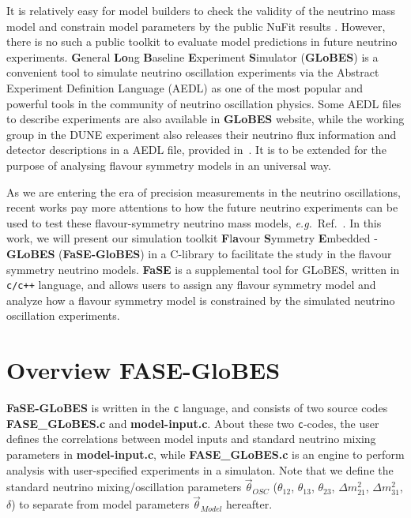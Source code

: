 \documentclass[aps,prd,nofootinbib,preprint]{revtex4}
\begin{document}
It is relatively easy for model builders to check the validity of the neutrino mass model and constrain model parameters by the public NuFit results \cite{Esteban:2018azc}. However, there is no such a public toolkit to evaluate model predictions in future neutrino experiments. \textbf{G}eneral \textbf{Lo}ng \textbf{B}aseline \textbf{E}xperiment \textbf{S}imulator (\textbf{GLoBES}) \cite{Huber:2004ka,Huber:2007ji} is a convenient tool to simulate neutrino oscillation experiments via the Abstract Experiment Definition Language (AEDL) as one of the most popular and powerful tools in the community of neutrino oscillation physics. Some AEDL files to describe experiments are also available in \textbf{GLoBES} website, while the working group in the DUNE experiment also releases their neutrino flux information and detector descriptions in a AEDL file, provided in~\cite{Alion:2016uaj}. It is to be extended for the purpose of analysing flavour symmetry models in an universal way. 

As we are entering the era of precision measurements in the neutrino oscillations, recent works pay more attentions to how the future neutrino experiments can be used to test these flavour-symmetry neutrino mass models, \textit{e.g.}~Ref.~\cite{Ballett:2016yod,Chatterjee:2017xkb, Ding:2019zhn, Tang:2019edw, Blennow:2020snb}. In this work, we will present our simulation toolkit \textbf{F}l\textbf{a}vour \textbf{S}ymmetry \textbf{E}mbedded - \textbf{GLoBES} (\textbf{FaSE-GloBES}) in a C-library to facilitate the study in the flavour symmetry neutrino models. \textbf{FaSE} is a supplemental tool for GLoBES, written in \texttt{c/c++} language, and allows users to assign any flavour symmetry model and analyze how a flavour symmetry model is constrained by the simulated neutrino oscillation experiments.

\section{Overview FASE-GloBES}\label{sec:overview}

\textbf{FaSE-GLoBES} is written in the \texttt{c} language, and consists of two source codes \textbf{FASE\_GLoBES.c} and \textbf{model-input.c}. About these two \texttt{c}-codes, the user defines the correlations between model inputs and standard neutrino mixing parameters in \textbf{model-input.c}, while \textbf{FASE\_GLoBES.c} is an engine to perform analysis with user-specified experiments in a simulaton. Note that we define the standard neutrino mixing/oscillation parameters $\vec{\theta}_{OSC}$ ($\theta_{12}$, $\theta_{13}$, $\theta_{23}$, $\Delta m_{21}^2$, $\Delta m_{31}^2$, $\delta$) to separate from model parameters $\vec{\theta}_{Model}$ hereafter.
\end{document}
